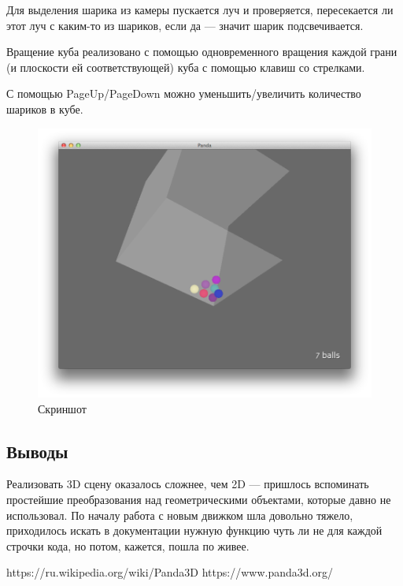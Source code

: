 \documentclass[12pt]{article}
\begin{document}
Для выделения шарика из камеры пускается луч и проверяется, пересекается ли этот луч с каким-то из шариков,
если да --- значит шарик подсвечивается.

Вращение куба реализовано с помощью одновременного вращения каждой грани (и плоскости ей соответствующей)
куба с помощью клавиш со стрелками.

С помощью PageUp/PageDown можно уменьшить/увеличить количество шариков в кубе.

\begin{figure}[!htb]
  \centering
    \includegraphics[scale=0.5]{pics/game.png}
   \caption{Скриншот}
    \label{fig:game}
\end{figure}

\subsection*{Выводы}
Реализовать 3D сцену оказалось сложнее, чем 2D --- пришлось вспоминать
простейшие преобразования над геометрическими объектами, которые давно
не использовал. По началу работа с новым движком шла довольно тяжело,
приходилось искать в документации нужную функцию чуть ли не для каждой строчки
кода, но потом, кажется, пошла по живее.

\begin{thebibliography}{}
 https://ru.wikipedia.org/wiki/Panda3D
 https://www.panda3d.org/
\end{thebibliography}
\end{document}
